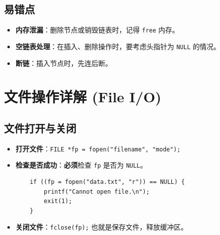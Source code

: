 \documentclass[a4paper,12pt]{article}
\begin{document}
\subsection{易错点}
\begin{itemize}
    \item \textbf{内存泄漏}：删除节点或销毁链表时，记得 \texttt{free} 内存。
    \item \textbf{空链表处理}：在插入、删除操作时，要考虑头指针为 \texttt{NULL} 的情况。
    \item \textbf{断链}：插入节点时，先连后断。
\end{itemize}

\section{文件操作详解 (File I/O)}

\subsection{文件打开与关闭}
\begin{itemize}
    \item \textbf{打开文件}：\texttt{FILE *fp = fopen("filename", "mode");}
    \item \textbf{检查是否成功}：\textbf{必须}检查 \texttt{fp} 是否为 \texttt{NULL}。
    \begin{lstlisting}
    if ((fp = fopen("data.txt", "r")) == NULL) {
        printf("Cannot open file.\n");
        exit(1);
    }
    \end{lstlisting}
    \item \textbf{关闭文件}：\texttt{fclose(fp);} 也就是保存文件，释放缓冲区。
\end{itemize}
\end{document}
